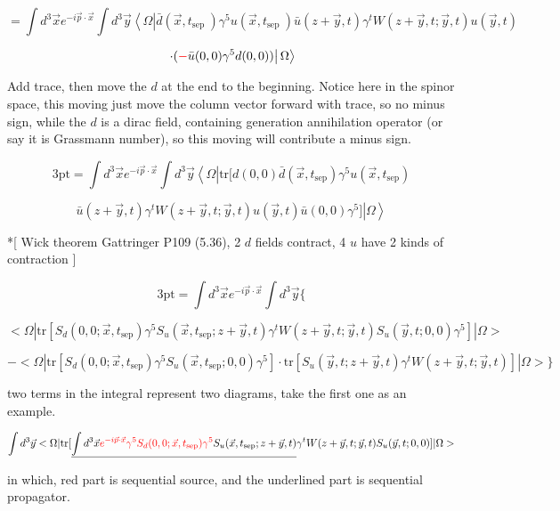 \documentclass[prd,aps,nofootinbib,floatfix,10pt]{revtex4}
\begin{document}
\[ = \int d^{3} \vec{x} e^{-i \vec{p} \cdot \vec{x}} \int d^3 \vec{y}\left\langle\Omega\left|\bar{d}\left(\vec{x}, t_{\text {sep }}\right) \gamma^{5} u\left(\vec{x}, t_{\text {sep }}\right) \bar{u}(z+\vec{y}, t) \gamma^{t} W(z+\vec{y}, t ; \vec{y}, t) u(\vec{y}, t) \right.\right.\]

\[\left. \left. \cdot ( {\color{red}-} \bar{u}(0, 0) \gamma^{5} d(0, 0) )  \right| \Omega\right\rangle \]

Add trace, then move the $d$ at the end to the beginning. {\color{red} Notice here in the spinor space, this moving just move the column vector forward with trace, so no minus sign, while the $d$ is a dirac field, containing generation annihilation operator (or say it is Grassmann number), so this moving will contribute a minus sign. }

\[ \text{3pt} = \int d^{3} \vec{x} e^{-i \vec{p} \cdot \vec{x}} \int d^3 \vec{y}\left\langle\Omega\left| \text{tr}[ d(0, 0) \bar{d}\left(\vec{x}, t_{\text {sep}}\right) \gamma^{5} u\left(\vec{x}, t_{\text {sep}}\right)   \right.\right.\]

\[\left. \left. \bar{u}(z+\vec{y}, t) \gamma^{t} W(z+\vec{y}, t ; \vec{y}, t) u(\vec{y}, t)  \bar{u}(0, 0) \gamma^{5}  ] \right| \Omega\right\rangle \]

*[ Wick theorem Gattringer P109 (5.36), 2 $d$ fields contract, 4 $u$ have 2 kinds of contraction ]

\[ \text{3pt} = \int d^{3} \vec{x} e^{-i \vec{p} \cdot \vec{x}} \int d^3 \vec{y} \{ \]

\[ <\Omega| \text{tr}[ S_d(0,0;\vec{x},t_{\text{sep}}) \gamma^{5} S_u(\vec{x},t_{\text{sep}};z+\vec{y},t) \gamma^{t} W(z+\vec{y}, t ; \vec{y}, t) S_u(\vec{y},t;0,0) \gamma^{5}  ] |\Omega> \]

\[ - <\Omega| \text{tr}[ S_d(0,0;\vec{x},t_{\text{sep}}) \gamma^{5} S_u(\vec{x},t_{\text{sep}};0,0) \gamma^{5}] \cdot \text{tr}[ S_u(\vec{y},t;z+\vec{y},t) \gamma^{t} W(z+\vec{y}, t ; \vec{y}, t) ] |\Omega> \} \]

two terms in the integral represent two diagrams, take the first one as an example.

\[ \int d^3 \vec{y} <\Omega| \text{tr}[  \underline{  \int d^{3} \vec{x} {\color{red} e^{-i \vec{p} \cdot \vec{x}} \gamma^{5}  S_d(0,0;\vec{x},t_{\text{sep}}) \gamma^{5} } S_u(\vec{x},t_{\text{sep}};z+\vec{y},t) }  \gamma^{t} W(z+\vec{y}, t ; \vec{y}, t) S_u(\vec{y},t;0,0)  ] |\Omega> \]

in which, red part is sequential source, and the underlined part is sequential propagator.
\end{document}
